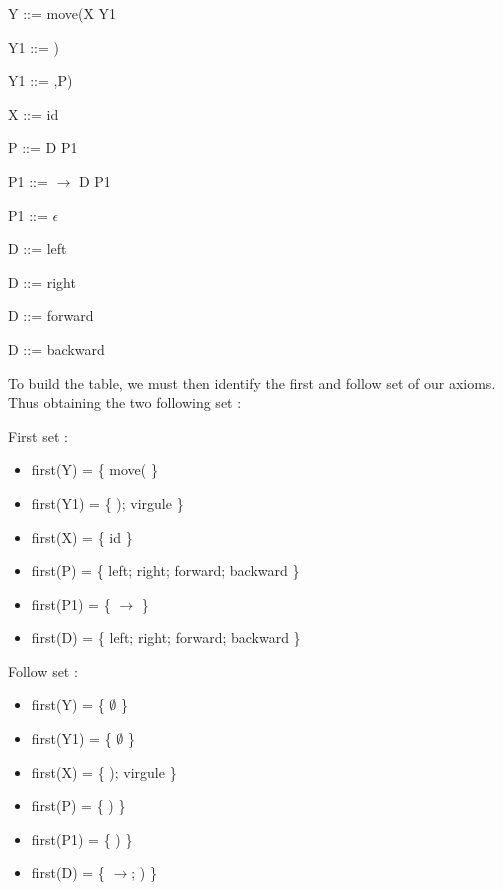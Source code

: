 \documentclass[a4paper, 11pt]{article}
\begin{document}
    \begin{minipage}{\linewidth}
        \begin{enumerate}
        \begin{minipage}{0.45\linewidth}
	           \item Y ::= move(X Y1
               \item Y1 ::= )
               \item Y1 ::= ,P)
               \item X ::= id
               \item P ::= D P1
               \item P1 ::= $\rightarrow$ D P1
        \end{minipage}
        \begin{minipage}{0.45\linewidth}
            \item P1 ::= $\epsilon$
            \item D ::= left
	        \item D ::= right
            \item D ::= forward
            \item D ::= backward
        \end{minipage}
        \end{enumerate}
    \end{minipage}
    \bigskip

	To build the table, we must then identify the first and follow set of our axioms.
	Thus obtaining the two following set :

    \begin{minipage}{\linewidth}
	\begin{minipage}[t]{0.45\linewidth}
		First set :
		\begin{itemize}
			\item first(Y) = \{ move( \}
			\item first(Y1) = \{ ); virgule \}
			\item first(X) = \{ id \}
			\item first(P) = \{ left; right; forward; backward \}
			\item first(P1) = \{ $\rightarrow$ \}
			\item first(D) = \{ left; right; forward; backward \}
		\end{itemize}
	\end{minipage}
    \begin{minipage}[t]{0.05\linewidth}
        \vrule{}
    \end{minipage}
	\begin{minipage}[t]{0.45\linewidth}
		Follow set :
		\begin{itemize}
			\item first(Y) = \{ $\emptyset$ \}
			\item first(Y1) = \{  $\emptyset$ \}
			\item first(X) = \{ ); virgule \}
			\item first(P) = \{ ) \}
			\item first(P1) = \{ ) \}
			\item first(D) = \{ $\rightarrow$; ) \}
		\end{itemize}
	\end{minipage}
    \end{minipage}
\end{document}
